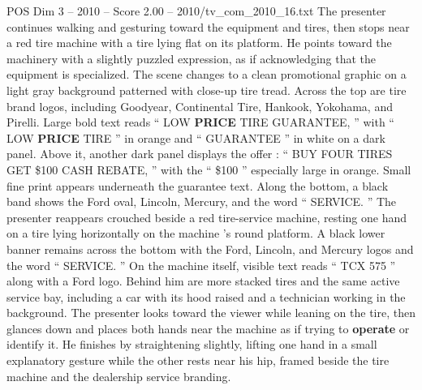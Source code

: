 \begin{textsample}{POS Dim 3 – 2010 – Score 2.00 – 2010/tv\_com\_2010\_16.txt}
The presenter continues walking and gesturing toward the equipment and tires, then stops near a red tire machine with a tire lying flat on its platform.
He points toward the machinery with a slightly puzzled expression, as if acknowledging that the equipment is specialized.
The scene changes to a clean promotional graphic on a light gray background patterned with close-up tire tread.
Across the top are tire brand logos, including Goodyear, Continental Tire, Hankook, Yokohama, and Pirelli.
Large bold text reads “ LOW \textbf{PRICE} TIRE GUARANTEE, ” with “ LOW \textbf{PRICE} TIRE ” in orange and “ GUARANTEE ” in white on a dark panel.
Above it, another dark panel displays the offer : “ BUY FOUR TIRES GET \$100 CASH REBATE, ” with the “ \$100 ” especially large in orange.
Small fine print appears underneath the guarantee text.
Along the bottom, a black band shows the Ford oval, Lincoln, Mercury, and the word “ SERVICE. ” The presenter reappears crouched beside a red tire-service machine, resting one hand on a tire lying horizontally on the machine ’s round platform.
A black lower banner remains across the bottom with the Ford, Lincoln, and Mercury logos and the word “ SERVICE. ” On the machine itself, visible text reads “ TCX 575 ” along with a Ford logo.
Behind him are more stacked tires and the same active service bay, including a car with its hood raised and a technician working in the background.
The presenter looks toward the viewer while leaning on the tire, then glances down and places both hands near the machine as if trying to \textbf{operate} or identify it.
He finishes by straightening slightly, lifting one hand in a small explanatory gesture while the other rests near his hip, framed beside the tire machine and the dealership service branding.

\end{textsample}
